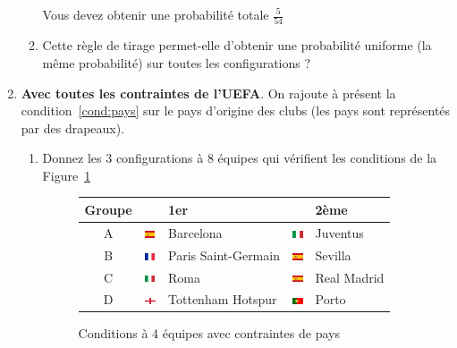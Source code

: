 \documentclass{../ficheTDTP}
\begin{document}
\begin{enumerate}
\begin{enumerate}
Vous devez obtenir une probabilité totale $\frac{5}{54}$

\item Cette règle de tirage permet-elle d'obtenir une probabilité uniforme (la même probabilité) sur toutes les configurations ?
\end{enumerate}

\item \textbf{Avec toutes les contraintes de l'UEFA}. On rajoute à présent la condition~\eqref{cond:pays} sur le pays d'origine des clubs (les pays sont représentés par des drapeaux).

\begin{enumerate}
\item Donnez les 3 configurations à 8 équipes qui vérifient les conditions de la Figure~\ref{fig:ex4-pays}

\begin{figure}[ht]
\begin{tabular}{|c|ll|ll|}
\hline
Groupe & & 1er & & 2ème \\ \hline
A & \includegraphics[height=0.2cm]{flags/es.png} & Barcelona & \includegraphics[height=0.2cm]{flags/it.png} & Juventus \\ \hline
B & \includegraphics[height=0.2cm]{flags/fr.png} & Paris Saint-Germain & \includegraphics[height=0.2cm]{flags/es.png} & Sevilla \\ \hline
C & \includegraphics[height=0.2cm]{flags/it.png} & Roma & \includegraphics[height=0.2cm]{flags/es.png} & Real Madrid \\ \hline
D & \includegraphics[height=0.2cm]{flags/en.png} & Tottenham Hotspur & \includegraphics[height=0.2cm]{flags/po.png} & Porto \\ \hline
\end{tabular}
\caption{Conditions à 4 équipes avec contraintes de pays}
\label{fig:ex4-pays}


\end{figure}
\end{enumerate}
\end{enumerate}
\end{document}
